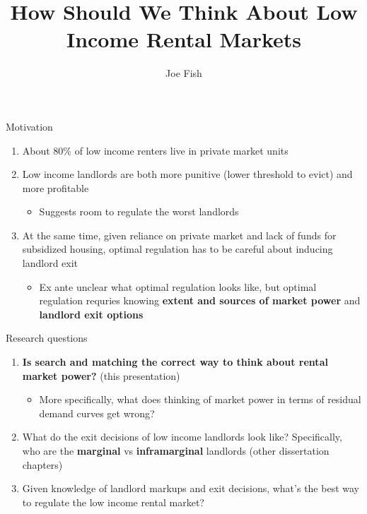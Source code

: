 \documentclass[10pt, xcolor=dvipsnames]{beamer}
\date{}
\title[Joe Fish Prospectus]{How Should We Think About Low Income Rental Markets} %
\author[Joe Fish]{Joe Fish}
\begin{document}
\begin{frame}
\titlepage %
\end{frame}



\begin{frame}{Motivation}
    \begin{enumerate}
        \item About 80\% of low income renters live in private market units \parencite{jchs_2024, nhpd2024profiles}
        \pause
        \item Low income landlords are both more punitive (lower threshold to evict) and more profitable \parencite{Desmond_2019, Eisfeldt_2015,Damen_2025}
        \begin{itemize}
            \item Suggests room to regulate the worst landlords
        \end{itemize}
        \pause
        \item At the same time, given reliance on private market and lack of funds for subsidized housing, optimal regulation has to be careful about inducing landlord exit
        \begin{itemize}
            \item Ex ante unclear what optimal regulation looks like, but optimal regulation requries knowing \textbf{extent and sources of market power} and \textbf{landlord exit options}
        \end{itemize}
    \end{enumerate}

\end{frame}

\begin{frame}{Research questions}

\begin{enumerate}
    \item \textbf{Is search and matching the correct way to think about rental market power?} (this presentation)
    \begin{itemize}
        \item More specifically, what does thinking of market power in terms of residual demand curves get wrong?
    \end{itemize}
    \pause
    \item What do the exit decisions of low income landlords look like? Specifically, who are the \textbf{marginal} vs \textbf{inframarginal} landlords (other dissertation chapters)
    \pause
    \item Given knowledge of landlord markups and exit decisions, what's the best way to regulate the low income rental market?
\end{enumerate}

\end{frame}
\end{document}
